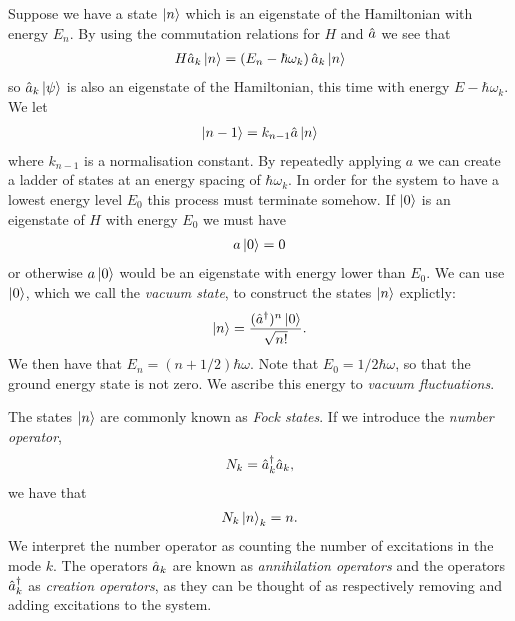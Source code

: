 Suppose we have a state $\left\vert n\right\rangle$ which is an eigenstate of the Hamiltonian with energy $E_n$. By using the commutation relations for $H$ and $\hat{a}$ we see that
\begin{align}
  H\hat{a}_k\left\vert n\right\rangle = \left(E_n - \hbar \omega_k\right) \hat{a}_k\left\vert n\right\rangle
\end{align}
so $\hat{a}_k\left\vert\psi\right\rangle$ is also an eigenstate of the Hamiltonian, this time with energy $E - \hbar\omega_k$. We let 
\begin{align}
  \left\vert n-1\right\rangle = k_{n-1}\hat{a} \left\vert n\right\rangle
\end{align}
where $k_{n-1}$ is a normalisation constant. By repeatedly applying $a$ we can create a ladder of states at an energy spacing of $\hbar\omega_k$. In order for the system to have a lowest energy level $E_0$ this process must terminate somehow. If $\left\vert0\right\rangle$ is an eigenstate of $H$ with energy $E_0$ we must have
\begin{align}
  a\left\vert0\right\rangle = 0
\end{align}
or otherwise $a\left\vert0\right\rangle$ would be an eigenstate with energy lower than $E_0$. We can use $\left\vert0\right\rangle$, which we call the \textit{vacuum state}, to construct the states $\left\vert n\right\rangle$ explictly:
\begin{align}
  \left\vert n\right\rangle = \frac{(\hat{a}^\dagger)^n \left\vert0\right\rangle}{\sqrt{n!}}. 
\end{align}
We then have that $E_n = (n+1/2)\hbar\omega$. Note that $E_0 = 1/2\hbar \omega$, so that the ground energy state is not zero. We ascribe this energy to \textit{vacuum fluctuations}.

The states $\left\vert n\right\rangle$ are commonly known as \textit{Fock states}. If we introduce the \textit{number operator},
\begin{align}
  N_k = \hat{a}^\dagger_k\hat{a}_k,
\end{align}
we have that
\begin{align}
  N_k\left\vert n\right\rangle_k = n.
\end{align}
We interpret the number operator as counting the number of excitations in the mode $k$. The operators $\hat{a}_k$ are known as \textit{annihilation operators} and the operators $\hat{a}^\dagger_k$ as \textit{creation operators}, as they can be thought of as respectively removing and adding excitations to the system. 


